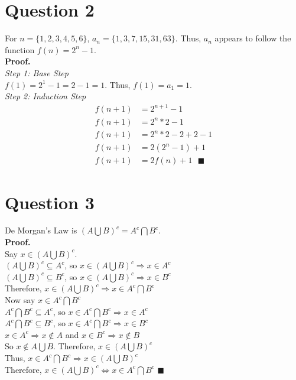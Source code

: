 \documentclass{article}
\begin{document}

\section*{Question 2}

For $n=\{1,2,3,4,5,6\}$, $a_n=\{1,3,7,15,31,63\}$. Thus, $a_n$ appears to follow the function $f(n)=2^n-1$.
\bigskip \\ 
\textbf{Proof.} 
\medskip \\
\textit{Step 1: Base Step} \\
$f(1)=2^1-1=2-1=1$. Thus, $f(1)=a_1=1$. 
\medskip \\
\textit{Step 2: Induction Step} \\
\begin{equation*}
	\begin{split}
		f(n+1) 	&= 2^{n+1} - 1			\\
		f(n+1) 	&= 2^n * 2 - 1			\\
		f(n+1) 	&= 2^n * 2 - 2 + 2 - 1	\\
		f(n+1) 	&= 2(2^n - 1) + 1		\\
		f(n+1) 	&= 2f(n) + 1 \text{ }\blacksquare
	\end{split}
\end{equation*}





\section*{Question 3}

De Morgan's Law is $(A\bigcup B)^c=A^c \bigcap B^c$.
\medskip \\
\textbf{Proof.}
\smallskip \\
Say $x\in (A\bigcup B)^c$. \\
$(A\bigcup B)^c\subseteq A^c$, so $x\in (A\bigcup B)^c\Rightarrow x\in A^c$ \\
$(A\bigcup B)^c\subseteq B^c$, so $x\in (A\bigcup B)^c\Rightarrow x\in B^c$ \\
Therefore, $x\in (A\bigcup B)^c \Rightarrow x\in A^c \bigcap B^c$
\medskip \\
Now say $x\in A^c \bigcap B^c$ \\
$A^c \bigcap B^c \subseteq A^c$, so $x\in A^c \bigcap B^c \Rightarrow x\in A^c$ \\
$A^c \bigcap B^c \subseteq B^c$, so $x\in A^c \bigcap B^c \Rightarrow x\in B^c$ \\
$x\in A^c\Rightarrow x\notin A$ and $x\in B^c\Rightarrow x\notin B$ \\
So $x\notin A\bigcup B$. Therefore, $x\in (A\bigcup B)^c$ \\
Thus,  $x\in A^c \bigcap B^c \Rightarrow x\in (A\bigcup B)^c$
\medskip \\
Therefore, $x\in (A\bigcup B)^c \iff x\in A^c \bigcap B^c$ $\blacksquare$
\end{document}
